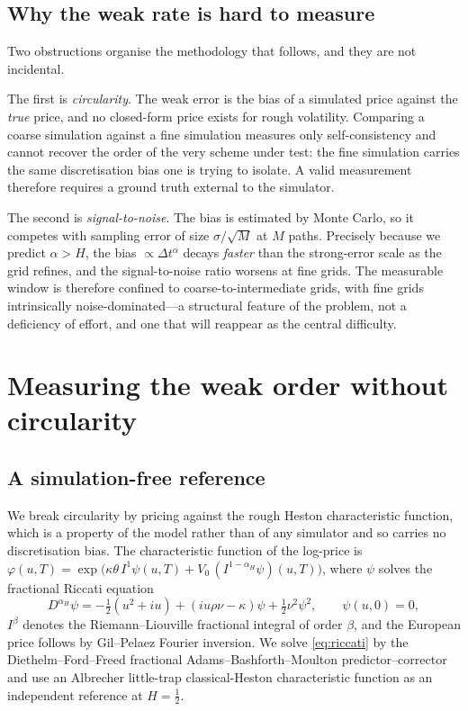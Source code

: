 \documentclass{siamonline250211}
\begin{document}
\subsection{Why the weak rate is hard to measure}

Two obstructions organise the methodology that follows, and they are not incidental.

The first is \emph{circularity}. The weak error is the bias of a simulated price against
the \emph{true} price, and no closed-form price exists for rough volatility. Comparing a
coarse simulation against a fine simulation measures only self-consistency and cannot
recover the order of the very scheme under test: the fine simulation carries the same
discretisation bias one is trying to isolate. A valid measurement therefore requires a
ground truth external to the simulator.

The second is \emph{signal-to-noise}. The bias is estimated by Monte Carlo, so it
competes with sampling error of size $\sigma/\sqrt{M}$ at $M$ paths. Precisely because
we predict $\alpha>H$, the bias $\propto \Delta t^{\alpha}$ decays \emph{faster} than the
strong-error scale as the grid refines, and the signal-to-noise ratio worsens at fine
grids. The measurable window is therefore confined to coarse-to-intermediate grids,
with fine grids intrinsically noise-dominated---a structural feature of the problem, not
a deficiency of effort, and one that will reappear as the central difficulty.

\section{Measuring the weak order without circularity}\label{sec:method}

\subsection{A simulation-free reference}

We break circularity by pricing against the rough Heston characteristic function, which
is a property of the model rather than of any simulator and so carries no discretisation
bias. The characteristic function of the log-price is
$\varphi(u,T)=\exp\big(\kappa\theta\,I^1\psi(u,T) + V_0\,(I^{1-\alpha_{\!H}}\psi)(u,T)\big)$,
where $\psi$ solves the fractional Riccati equation
\begin{equation}
D^{\alpha_{\!H}}\psi
 = -\tfrac12(u^2+iu) + (iu\rho\nu - \kappa)\psi + \tfrac12\nu^2\psi^2,
\qquad \psi(u,0)=0, \label{eq:riccati}
\end{equation}
$I^{\beta}$ denotes the Riemann--Liouville fractional integral of order $\beta$, and the
European price follows by Gil--Pelaez Fourier inversion. We solve \eqref{eq:riccati}
by the Diethelm--Ford--Freed fractional Adams--Bashforth--Moulton predictor--corrector
and use an Albrecher little-trap classical-Heston characteristic function as an
independent reference at $H=\tfrac12$.
\end{document}
